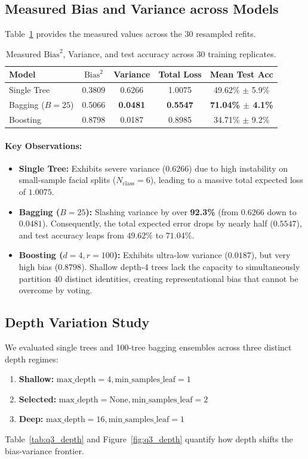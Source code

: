 \documentclass[10pt,twocolumn,letterpaper]{article}
\begin{document}
\subsection{Measured Bias and Variance across Models}
Table~\ref{tab:q3_part_a} provides the measured values across the 30 resampled refits.

\begin{table}[h]
\centering
\small
\caption{Measured $\text{Bias}^2$, Variance, and test accuracy across 30 training replicates.}
\label{tab:q3_part_a}
\begin{tabular}{lcccc}
\toprule
Model & $\text{Bias}^2$ & Variance & Total Loss & Mean Test Acc \\
\midrule
Single Tree & 0.3809 & 0.6266 & 1.0075 & 49.62\% $\pm$ 5.9\% \\
Bagging ($B=25$) & 0.5066 & \textbf{0.0481} & \textbf{0.5547} & \textbf{71.04\% $\pm$ 4.1\%} \\
Boosting & 0.8798 & 0.0187 & 0.8985 & 34.71\% $\pm$ 9.2\% \\
\bottomrule
\end{tabular}
\end{table}

\paragraph{Key Observations:}
\begin{itemize}[leftmargin=*]
    \item \textbf{Single Tree:} Exhibits severe variance ($0.6266$) due to high instability on small-sample facial splits ($N_{\text{class}}=6$), leading to a massive total expected loss of $1.0075$.
    \item \textbf{Bagging ($B=25$):} Slashing variance by over \textbf{92.3\%} (from $0.6266$ down to $0.0481$). Consequently, the total expected error drops by nearly half ($0.5547$), and test accuracy leaps from $49.62\%$ to $71.04\%$.
    \item \textbf{Boosting ($d=4, r=100$):} Exhibits ultra-low variance ($0.0187$), but very high bias ($0.8798$). Shallow depth-4 trees lack the capacity to simultaneously partition 40 distinct identities, creating representational bias that cannot be overcome by voting.
\end{itemize}

\subsection{Depth Variation Study}
We evaluated single trees and 100-tree bagging ensembles across three distinct depth regimes:
\begin{enumerate}[leftmargin=*]
    \item \textbf{Shallow:} $\text{max\_depth}=4, \text{min\_samples\_leaf}=1$
    \item \textbf{Selected:} $\text{max\_depth}=\text{None}, \text{min\_samples\_leaf}=2$
    \item \textbf{Deep:} $\text{max\_depth}=16, \text{min\_samples\_leaf}=1$
\end{enumerate}
Table~\ref{tab:q3_depth} and Figure~\ref{fig:q3_depth} quantify how depth shifts the bias-variance frontier.
\end{document}
